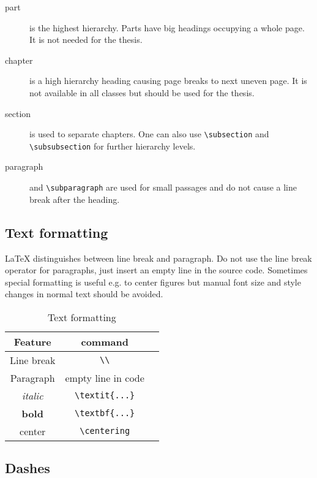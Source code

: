 \begin{description}
	\item [part] is the highest hierarchy. Parts have big headings occupying a whole page. It is not needed for the thesis.
	\item [chapter] is a high hierarchy heading causing page breaks to next uneven page. It is not available in all classes but should be used for the thesis.
	\item [section] is used to separate chapters. One can also use \verb|\subsection| and \verb|\subsubsection| for further hierarchy levels.
	\item [paragraph] and \verb|\subparagraph| are used for small passages and do not cause a line break after the heading.
\end{description}

\subsection{Text formatting}

LaTeX distinguishes between line break and paragraph. Do not use the line break operator for paragraphs, just insert an empty line in the source code. Sometimes special formatting is useful e.g. to center figures but manual font size and style changes in normal text should be avoided.

\begin{table}[H]
	\centering
	\caption{Text formatting}
	\label{tab:textformat}
	\begin{tabular}{ccc}
		\toprule
		Feature & command\\
		\midrule
		Line break & \verb|\\| \\
		Paragraph & empty line in code \\
		\textit{italic} & \verb|\textit{...}| \\
		\textbf{bold} & \verb|\textbf{...}| \\
		center & \verb|\centering| \\	
		\bottomrule
	\end{tabular}
\end{table}

\subsection{Dashes}


